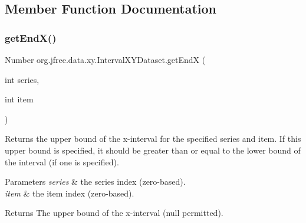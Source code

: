 \subsection{Member Function Documentation}
\mbox{\label{interfaceorg_1_1jfree_1_1data_1_1xy_1_1_interval_x_y_dataset_a93161a6d6c1db37cfac030239c62ab0a}} 
\subsubsection{\texorpdfstring{get\+End\+X()}{getEndX()}}
{\footnotesize\ttfamily Number org.\+jfree.\+data.\+xy.\+Interval\+X\+Y\+Dataset.\+get\+EndX (\begin{DoxyParamCaption}\item[{int}]{series,  }\item[{int}]{item }\end{DoxyParamCaption})}

Returns the upper bound of the x-\/interval for the specified series and item. If this upper bound is specified, it should be greater than or equal to the lower bound of the interval (if one is specified).


\begin{DoxyParams}{Parameters}
{\em series} & the series index (zero-\/based). \\
\hline
{\em item} & the item index (zero-\/based).\\
\hline
\end{DoxyParams}
\begin{DoxyReturn}{Returns}
The upper bound of the x-\/interval ({\ttfamily null} permitted). 
\end{DoxyReturn}


